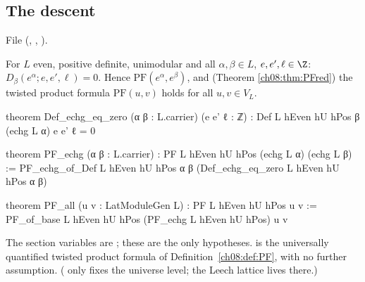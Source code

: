 \subsection{The descent}
File  (, , ).
\begin{theorem}\label{ch08:thm:descent}
For $L$ even, positive definite, unimodular and all $\alpha,\beta\in L$, $e,e',\ell\in\Z$:
$D_\beta(e^\alpha;e,e',\ell)=0$.  Hence $\mathrm{PF}(e^\alpha,e^\beta)$, and (Theorem
\ref{ch08:thm:PFred}) the twisted product formula $\mathrm{PF}(u,v)$ holds for all $u,v\in V_L$.
\end{theorem}
\begin{leancode}
theorem Def_echg_eq_zero (α β : L.carrier) (e e' ℓ : ℤ) :
    Def L hEven hU hPos β (echg L α) e e' ℓ = 0

theorem PF_echg (α β : L.carrier) : PF L hEven hU hPos (echg L α) (echg L β) :=
  PF_echg_of_Def L hEven hU hPos α β (Def_echg_eq_zero L hEven hU hPos α β)

theorem PF_all (u v : LatModuleGen L) : PF L hEven hU hPos u v :=
  PF_of_base L hEven hU hPos (PF_echg L hEven hU hPos) u v
\end{leancode}
\begin{dictionary}
The section variables are ;
these are the only hypotheses.   is the universally quantified twisted product formula
of Definition~\ref{ch08:def:PF}, with no further assumption.  ( only
fixes the universe level; the Leech lattice lives there.)
\end{dictionary}

